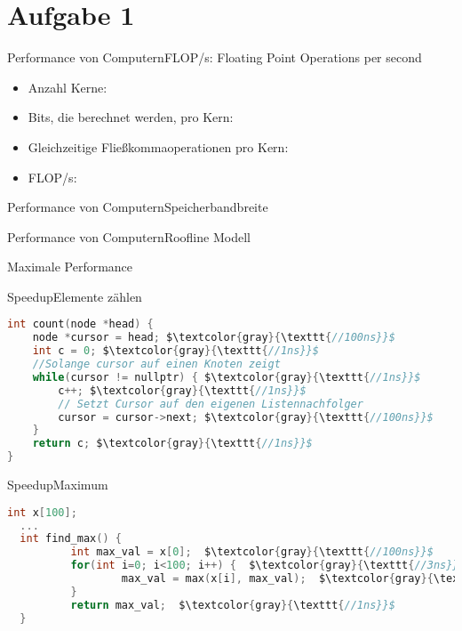 \documentclass[
  german,            %
  aspectratio=169,    %
  sectionpage=false,   %
]{tumbeamer}
\begin{document}
\section{Aufgabe 1}
\begin{frame}{Performance von Computern}{FLOP/s: Floating Point Operations per second}
  \begin{itemize}
    \item Anzahl Kerne:
    \item Bits, die berechnet werden, pro Kern:
    \item Gleichzeitige Fließkommaoperationen pro Kern:
    \item FLOP/s:
  \end{itemize}
\end{frame}
\begin{frame}{Performance von Computern}{Speicherbandbreite}
\end{frame}
\begin{frame}{Performance von Computern}{Roofline Modell}
\end{frame}
\begin{frame}{Maximale Performance}
\end{frame}
\begin{frame}[fragile]{Speedup}{Elemente zählen}
\begin{lstlisting}[language=C, mathescape]
int count(node *head) {
    node *cursor = head; $\textcolor{gray}{\texttt{//100ns}}$
    int c = 0; $\textcolor{gray}{\texttt{//1ns}}$
    //Solange cursor auf einen Knoten zeigt
    while(cursor != nullptr) { $\textcolor{gray}{\texttt{//1ns}}$
        c++; $\textcolor{gray}{\texttt{//1ns}}$
        // Setzt Cursor auf den eigenen Listennachfolger
        cursor = cursor->next; $\textcolor{gray}{\texttt{//100ns}}$
    }
    return c; $\textcolor{gray}{\texttt{//1ns}}$
}
\end{lstlisting}
\end{frame}
\begin{frame}[fragile]{Speedup}{Maximum}
\begin{lstlisting}[language=C, mathescape]
  int x[100];
  ...
  int find_max() {
          int max_val = x[0];  $\textcolor{gray}{\texttt{//100ns}}$
          for(int i=0; i<100; i++) {  $\textcolor{gray}{\texttt{//3ns}}$
                  max_val = max(x[i], max_val);  $\textcolor{gray}{\texttt{//17ns}}$
          }
          return max_val;  $\textcolor{gray}{\texttt{//1ns}}$
  }
  \end{lstlisting}
\end{frame}
\end{document}
